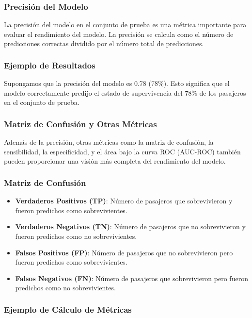 \subsubsection*{Precisión del Modelo}

La precisión del modelo en el conjunto de prueba es una métrica importante para evaluar el rendimiento del modelo. La precisión se calcula como el número de predicciones correctas dividido por el número total de predicciones.

\subsubsection*{Ejemplo de Resultados}

Supongamos que la precisión del modelo es 0.78 (78\%). Esto significa que el modelo correctamente predijo el estado de supervivencia del 78\% de los pasajeros en el conjunto de prueba.

\subsubsection*{Matriz de Confusión y Otras Métricas}

Además de la precisión, otras métricas como la matriz de confusión, la sensibilidad, la especificidad, y el área bajo la curva ROC (AUC-ROC) también pueden proporcionar una visión más completa del rendimiento del modelo.

\subsubsection*{Matriz de Confusión}

\begin{itemize}
    \item \textbf{Verdaderos Positivos (TP)}: Número de pasajeros que sobrevivieron y fueron predichos como sobrevivientes.
    \item \textbf{Verdaderos Negativos (TN)}: Número de pasajeros que no sobrevivieron y fueron predichos como no sobrevivientes.
    \item \textbf{Falsos Positivos (FP)}: Número de pasajeros que no sobrevivieron pero fueron predichos como sobrevivientes.
    \item \textbf{Falsos Negativos (FN)}: Número de pasajeros que sobrevivieron pero fueron predichos como no sobrevivientes.
\end{itemize}

\subsubsection*{Ejemplo de Cálculo de Métricas}

